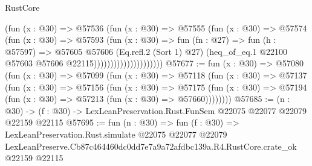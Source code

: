 \begin{lexlean}{RustCore}
\begin{coremodule}
                                  (fun (x : @30) =>
                                  @57536
                                    (fun (x : @30) =>
                                    @57555
                                      (fun (x : @30) =>
                                      @57574
                                        (fun (x : @30) =>
                                        @57593
                                          (fun (x : @30) =>
                                          fun (fn : @27) =>
                                          fun (h : @57597) =>
                                          @57605
                                            @57606
                                            (Eq.refl.{2} (Sort 1) @27)
                                            (heq_of_eq.{1}
                                              @22100
                                              @57603
                                              @57606
                                              @22115)))))))))))))))))))))
@57677 := fun (x : @30) =>
  @57080
    (fun (x : @30) =>
    @57099
      (fun (x : @30) =>
      @57118
        (fun (x : @30) =>
        @57137
          (fun (x : @30) =>
          @57156
            (fun (x : @30) =>
            @57175
              (fun (x : @30) => @57194 (fun (x : @30) => @57213 (fun (x : @30) => @57660))))))))
@57685 := (n : @30) ->
  (f : @30) -> LexLeanPreservation.Rust.FunSem @22075 @22077 @22079 @22159 @22115
@57695 := fun (n : @30) =>
  fun (f : @30) =>
  LexLeanPreservation.Rust.simulate
    @22075
    @22077
    @22079
    LexLeanPreserve.Cb87c464460dc0dd7e7a9a72afdbc139a.R4.RustCore.crate_ok
    @22159
    @22115
\end{coremodule}
\end{lexlean}
